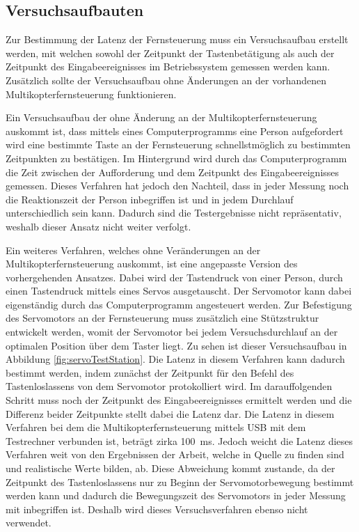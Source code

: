 \subsection{Versuchsaufbauten}
Zur Bestimmung der Latenz der Fernsteuerung muss ein Versuchsaufbau erstellt werden, mit welchen sowohl der Zeitpunkt der Tastenbetätigung als auch der Zeitpunkt des Eingabeereignisses im Betriebssystem gemessen werden kann. Zusätzlich sollte der Versuchsaufbau ohne Änderungen an der vorhandenen Multikopterfernsteuerung funktionieren.

Ein Versuchsaufbau der ohne Änderung an der Multikopterfernsteuerung auskommt ist, dass mittels eines Computerprogramms eine Person aufgefordert wird eine bestimmte Taste an der Fernsteuerung schnellstmöglich zu bestimmten Zeitpunkten zu bestätigen. Im Hintergrund wird durch das Computerprogramm die Zeit zwischen der Aufforderung und dem Zeitpunkt des Eingabeereignisses gemessen. Dieses Verfahren hat jedoch den Nachteil, dass in jeder Messung noch die Reaktionszeit der Person inbegriffen ist und in jedem Durchlauf unterschiedlich sein kann. Dadurch sind die Testergebnisse nicht repräsentativ, weshalb dieser Ansatz nicht weiter verfolgt.

Ein weiteres Verfahren, welches ohne Veränderungen an der Multikopterfernsteuerung auskommt, ist eine angepasste Version des vorhergehenden Ansatzes. Dabei wird der Tastendruck von einer Person, durch einen Tastendruck mittels eines Servos ausgetauscht. Der Servomotor kann dabei eigenständig durch das Computerprogramm angesteuert werden. Zur Befestigung des Servomotors an der Fernsteuerung muss zusätzlich eine Stützstruktur entwickelt werden, womit der Servomotor bei jedem Versuchsdurchlauf an der optimalen Position über dem Taster liegt. Zu sehen ist dieser Versuchsaufbau in Abbildung \ref{fig:servoTestStation}. Die Latenz in diesem Verfahren kann dadurch bestimmt werden, indem zunächst der Zeitpunkt für den Befehl des Tastenloslassens von dem Servomotor protokolliert wird. Im darauffolgenden Schritt muss noch der Zeitpunkt des Eingabeereignisses ermittelt werden und die Differenz beider Zeitpunkte stellt dabei die Latenz dar. Die Latenz in diesem Verfahren bei dem die Multikopterfernsteuerung mittels USB mit dem Testrechner verbunden ist, beträgt zirka 100~ms. Jedoch weicht die Latenz dieses Verfahren weit von den Ergebnissen der Arbeit, welche in Quelle \cite{wimmerLatenzStation} zu finden sind und realistische Werte bilden, ab. Diese Abweichung kommt zustande, da der Zeitpunkt des Tastenloslassens nur zu Beginn der Servomotorbewegung bestimmt werden kann und dadurch die Bewegungszeit des Servomotors in jeder Messung mit inbegriffen ist. Deshalb wird dieses Versuchsverfahren ebenso nicht verwendet.

